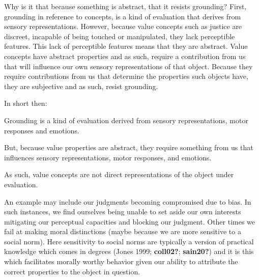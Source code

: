 \documentclass[12pt]{book}
\theoremstyle{definition}
\theoremstyle{remark}
\newcommand{\NormalTok}[1]{#1}
\newenvironment{Shaded}{}{}
\newenvironment{Highlighting}{}{}
\begin{document}
Why is it that because something is abstract, that it resists grounding? First, grounding in reference to concepts, is a kind of evaluation that derives from sensory representations. However, because value concepts such as justice are discreet, incapable of being touched or manipulated, they lack perceptible features. This lack of perceptible features means that they are abstract. Value concepts have abstract properties and as such, require a contribution from us that will influence our own sensory representations of that object. Because they require contributions from us that determine the properties such objects have, they are subjective and as such, resist grounding.

In short then:

\begin{Shaded}
\begin{Highlighting}[]

\NormalTok{Grounding is a kind of evaluation derived from sensory representations, motor responses and emotions.}
\end{Highlighting}
\end{Shaded}

\begin{Shaded}
\begin{Highlighting}[]

\NormalTok{But, because value properties are abstract, they require something from us that influences sensory representations, motor responses, and emotions.}
\end{Highlighting}
\end{Shaded}

\begin{Shaded}
\begin{Highlighting}[]

\NormalTok{As such, value concepts are not direct representations of the object under evaluation.}
\end{Highlighting}
\end{Shaded}

An example may include our judgments becoming compromised due to bias. In such instances, we find ourselves being unable to set aside our own interests mitigating our perceptual capacities and blocking our judgment. Other times we fail at making moral distinctions (maybe because we are more sensitive to a social norm). Here sensitivity to social norms are typically a version of practical knowledge which comes in degrees (Jones 1999; \textbf{coll02?}; \textbf{sain20?}) and it is this which facilitates morally worthy behavior given our ability to attribute the correct properties to the object in question.
\end{document}
